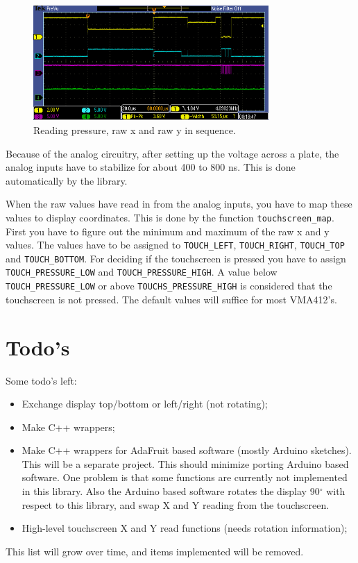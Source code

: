 \documentclass[12pt]{article}
\begin{document}
\begin{figure}[!ht]
\centering
\includegraphics[width=0.8\textwidth]{sample_pressure_x_y}
\caption{Reading pressure, raw x and\textbf{} raw y in sequence.}
\label{fig:26}
\end{figure}

Because of the analog circuitry, after setting up the voltage across a plate, the analog inputs have to stabilize for about 400 to 800 ns. This is done automatically by the library.

When the raw values have read in from the analog inputs, you have to map these values to display coordinates. This is done by the function \lstinline|touchscreen_map|. First you have to figure out the minimum and maximum of the raw x and y values. The values have to be assigned to \lstinline|TOUCH_LEFT|, \lstinline|TOUCH_RIGHT|, \lstinline|TOUCH_TOP| and \lstinline|TOUCH_BOTTOM|. For deciding if the touchscreen is pressed you have to assign \lstinline|TOUCH_PRESSURE_LOW| and \lstinline|TOUCH_PRESSURE_HIGH|. A value below \lstinline|TOUCH_PRESSURE_LOW| or above \lstinline|TOUCHS_PRESSURE_HIGH| is considered that the touchscreen is not pressed. The default values will suffice for most VMA412's.

\section{Todo's}
Some todo's left:

\begin{itemize}
\item Exchange display top/bottom or left/right (not rotating);
\item Make C++ wrappers;
\item Make C++ wrappers for AdaFruit based software (mostly Arduino sketches). This will be a separate project. This should minimize porting Arduino based software. One problem is that some functions are currently not implemented in this library. Also the Arduino based software rotates the display 90$^\circ$ with respect to this library, and swap X and Y reading from the touchscreen.
\item High-level touchscreen X and Y read functions (needs rotation information);
\end{itemize}

This list will grow over time, and items implemented will be removed.

\cleardoublepage
{}
{}

\printindex
\end{document}
